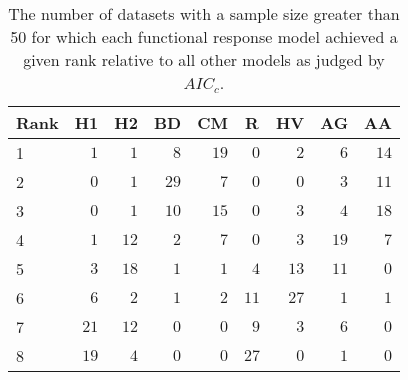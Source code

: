 \begin{table}[!tbp]
\caption{The number of datasets with a sample size greater than 50 for which each functional response model achieved a given rank relative to all other models as judged by $AIC_c$.\label{table:AICc_rankings_top50}} 
\begin{center}
\begin{tabular}{lrrrrrrrr}
\hline\hline
\multicolumn{1}{l}{Rank}&\multicolumn{1}{c}{H1}&\multicolumn{1}{c}{H2}&\multicolumn{1}{c}{BD}&\multicolumn{1}{c}{CM}&\multicolumn{1}{c}{R}&\multicolumn{1}{c}{HV}&\multicolumn{1}{c}{AG}&\multicolumn{1}{c}{AA}\tabularnewline
\hline
1&$ 1$&$ 1$&$ 8$&$19$&$ 0$&$ 2$&$ 6$&$14$\tabularnewline
2&$ 0$&$ 1$&$29$&$ 7$&$ 0$&$ 0$&$ 3$&$11$\tabularnewline
3&$ 0$&$ 1$&$10$&$15$&$ 0$&$ 3$&$ 4$&$18$\tabularnewline
4&$ 1$&$12$&$ 2$&$ 7$&$ 0$&$ 3$&$19$&$ 7$\tabularnewline
5&$ 3$&$18$&$ 1$&$ 1$&$ 4$&$13$&$11$&$ 0$\tabularnewline
6&$ 6$&$ 2$&$ 1$&$ 2$&$11$&$27$&$ 1$&$ 1$\tabularnewline
7&$21$&$12$&$ 0$&$ 0$&$ 9$&$ 3$&$ 6$&$ 0$\tabularnewline
8&$19$&$ 4$&$ 0$&$ 0$&$27$&$ 0$&$ 1$&$ 0$\tabularnewline
\hline
\end{tabular}\end{center}
\end{table}
